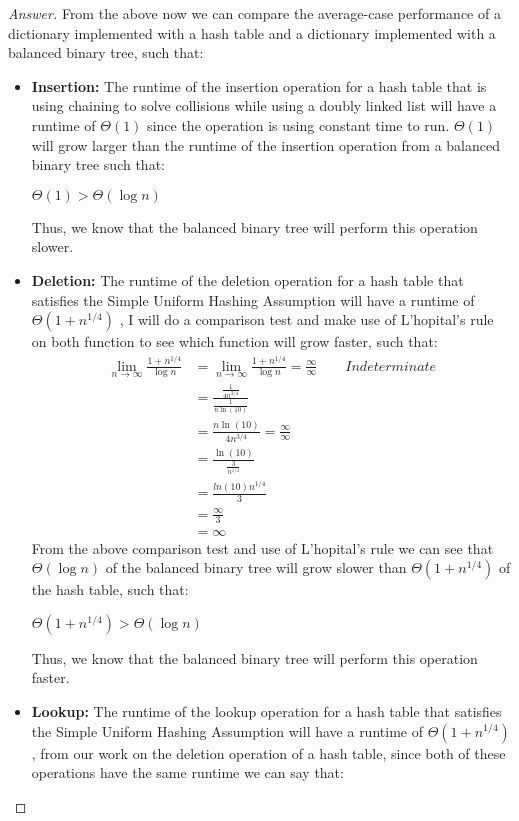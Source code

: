 \documentclass[11pt]{article}
\theoremstyle{definition}
\theoremstyle{definition}
\theoremstyle{definition}
\begin{document}
\begin{enumerate}[label=(\alph*)]
\begin{proof}[Answer]
        From the above now we can compare the average-case performance of a dictionary implemented with a hash table and a dictionary implemented with a balanced binary tree, such that: \\
        \begin{itemize}
        \item \textbf{Insertion:} The runtime of the insertion operation for a hash table that is using chaining to solve collisions while using a doubly linked list will have a runtime of $\Theta(1)$ since the operation is using constant time to run. $\Theta(1)$ will grow larger than the runtime of the insertion operation from a balanced binary tree such that: \\
\begin{center}
$\Theta(1) > \Theta(\log n)$
\end{center}
Thus, we know that the balanced binary tree will perform this operation slower.
\item \textbf{Deletion:} The runtime of the deletion operation for a hash table that satisfies the Simple Uniform Hashing Assumption will have a runtime of $\Theta(1+ n^{1/4})$ , I will do a comparison test and make use of L'hopital's rule on both function to see which function will grow faster, such that: \\
\begin{align*}
\lim_{n \to \infty} \frac{1 + n^{1/4}}{\log n} &= \lim_{n \to \infty} \frac{1 + n^{1/4}}{\log n} = \frac{\infty}{\infty} \qquad Indeterminate \\
&= \frac{\frac{1}{4n^{3/4}}}{\frac{1}{n\ln(10)}} \\
&= \frac{n\ln(10)}{4n^{3/4}} = \frac{\infty}{\infty} \qquad \\
&= \frac{\ln(10)}{\frac{3}{n^{1/4}}} \\
& = \frac{ln(10) n^{1/4}}{3}\\
&= \frac{\infty}{3} \\
&= \infty
\end{align*}
From the above comparison test and use of L'hopital's rule we can see that $\Theta(\log n)$  of the balanced binary tree will grow slower than $\Theta(1+ n^{1/4})$ of the hash table, such that: \\
\begin{center}
$\Theta(1+n^{1/4}) > \Theta(\log n)$ \\
\end{center}
Thus, we know that the balanced binary tree will perform this operation faster.
\item \textbf{Lookup:} The runtime of the lookup operation for a hash table that satisfies the Simple Uniform Hashing Assumption will have a runtime of $\Theta(1+n^{1/4})$, from our work on the deletion operation of a hash table, since both of these operations have the same runtime we can say that: \\

\end{itemize}
\end{proof}
\end{enumerate}
\end{document}

